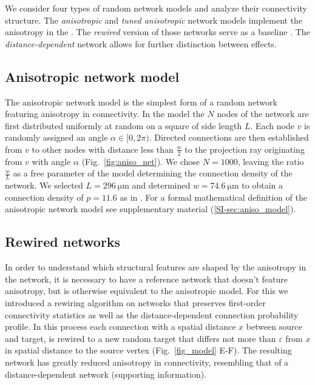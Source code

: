 
We consider four types of random network models and analyze their
connectivity structure. The \textit{anisotropic} and \textit{tuned
anisotropic} network models implement the anisotropy in the
. The \textit{rewired} version of those networks serve as a baseline
. The \textit{distance-dependent} network allows for further
distinction between effects.

\subsection*{Anisotropic network model}

The anisotropic network model is the simplest form of a random network
featuring anisotropy in connectivity. In the model the $N$ nodes of
the network are first distributed uniformly at random on a square of
side length $L$. Each node $v$ is randomly assigned an angle $\alpha
\in [0,2\pi)$. Directed connections are then established from $v$ to
other nodes with distance less than $\frac{w}{2}$ to the projection
ray originating from $v$ with angle $\alpha$ (Fig.~\ref{fig:aniso_net}).
We chose $N=1000$, leaving the ratio $\frac{w}{L}$ as a free parameter
of the model determining the connection density of the network. We
selected $L=\SI{296}{\micro\meter}$ and determined $w=\SI{74.6}%
{\micro\meter}$ to obtain a connection density of $p=11.6$ as in
\cite{Song2005}. For a formal mathematical definition of the
anisotropic network model see supplementary material
(\ref{SI-sec:aniso_model}).






\bigskip

\subsection*{Rewired networks}
%
In order to understand which structural features are shaped by the
anisotropy in the network, it is necessary to have a reference network
that doesn't feature anisotropy, but is otherwise equivalent to the
anisotropic model. For this we introduced a rewiring algorithm on
networks that preserves first-order connectivity statistics %
as well as the distance-dependent connection probability profile. In
this process each connection with a spatial distance $x$ between
source and target, is rewired to a new random target that differs not
more than $\varepsilon$ from $x$ in spatial distance to the source
vertex (Fig.~\ref{fig_model} E-F). The resulting network has greatly
reduced anisotropy in connectivity, resembling that of a
distance-dependent network (supporting information).

